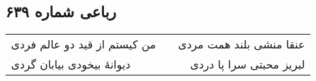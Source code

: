 \begin{center}
\section*{رباعی شماره ۶۳۹}
\label{sec:sh639}
\begin{longtable}{l p{0.5cm} r}
من کیستم از قید دو عالم فردی
&&
عنقا منشی بلند همت مردی
\\
دیوانهٔ بیخودی بیابان گردی
&&
لبریز محبتی سرا پا دردی
\\
\end{longtable}
\end{center}
